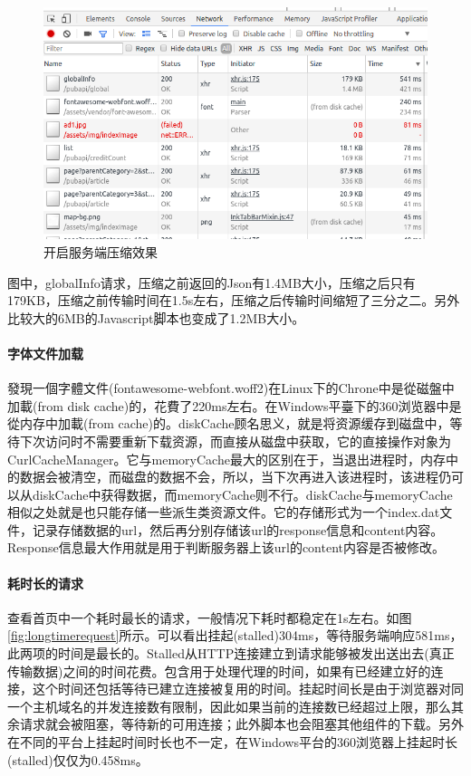 \documentclass[letter]{book}
\begin{document}
\begin{figure}[htbp]
	\centering
	\includegraphics[scale=0.5]{openservercompress.png}
	\caption{开启服务端压缩效果}
	\label{fig:openservercompress}
\end{figure}

图中，globalInfo请求，压缩之前返回的Json有1.4MB大小，压缩之后只有179KB，压缩之前传输时间在1.5s左右，压缩之后传输时间缩短了三分之二。另外比较大的6MB的Javascript脚本也变成了1.2MB大小。

\paragraph{字体文件加载}

發現一個字體文件(fontawesome-webfont.woff2)在Linux下的Chrone中是從磁盤中加載(from disk cache)的，花費了220ms左右。在Windows平臺下的360浏览器中是從内存中加載(from cache)的。diskCache顾名思义，就是将资源缓存到磁盘中，等待下次访问时不需要重新下载资源，而直接从磁盘中获取，它的直接操作对象为CurlCacheManager。它与memoryCache最大的区别在于，当退出进程时，内存中的数据会被清空，而磁盘的数据不会，所以，当下次再进入该进程时，该进程仍可以从diskCache中获得数据，而memoryCache则不行。diskCache与memoryCache相似之处就是也只能存储一些派生类资源文件。它的存储形式为一个index.dat文件，记录存储数据的url，然后再分别存储该url的response信息和content内容。Response信息最大作用就是用于判断服务器上该url的content内容是否被修改。

\paragraph{耗时长的请求}

查看首页中一个耗时最长的请求，一般情况下耗时都稳定在1s左右。如图\ref{fig:longtimerequest}所示。可以看出挂起(stalled)304ms，等待服务端响应581ms，此两项的时间是最长的。Stalled从HTTP连接建立到请求能够被发出送出去(真正传输数据)之间的时间花费。包含用于处理代理的时间，如果有已经建立好的连接，这个时间还包括等待已建立连接被复用的时间。挂起时间长是由于浏览器对同一个主机域名的并发连接数有限制，因此如果当前的连接数已经超过上限，那么其余请求就会被阻塞，等待新的可用连接；此外脚本也会阻塞其他组件的下载。另外在不同的平台上挂起时间时长也不一定，在Windows平台的360浏览器上挂起时长(stalled)仅仅为0.458ms。
\end{document}
